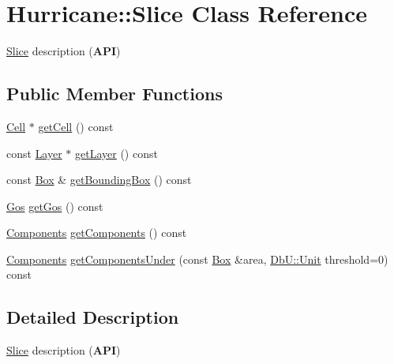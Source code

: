 \hypertarget{classHurricane_1_1Slice}{}\section{Hurricane\+:\+:Slice Class Reference}
\label{classHurricane_1_1Slice}


\mbox{\hyperlink{classHurricane_1_1Slice}{Slice}} description ({\bfseries A\+PI})  


\subsection*{Public Member Functions}
\begin{DoxyCompactItemize}
\item 
\mbox{\hyperlink{classHurricane_1_1Cell}{Cell}} $\ast$ \mbox{\hyperlink{classHurricane_1_1Slice_ae7a75f373a3d4e8878007c38688000f8}{get\+Cell}} () const
\item 
const \mbox{\hyperlink{classHurricane_1_1Layer}{Layer}} $\ast$ \mbox{\hyperlink{classHurricane_1_1Slice_a76c011cd461e588474a22fd0026e1f8f}{get\+Layer}} () const
\item 
const \mbox{\hyperlink{classHurricane_1_1Box}{Box}} \& \mbox{\hyperlink{classHurricane_1_1Slice_aa1a139b188879c37a8878a2353401d65}{get\+Bounding\+Box}} () const
\item 
\mbox{\hyperlink{namespaceHurricane_a4456a34f3bc6766d471c3064ace19759}{Gos}} \mbox{\hyperlink{classHurricane_1_1Slice_abc257f5b91c01c01a618787fd73db97b}{get\+Gos}} () const
\item 
\mbox{\hyperlink{namespaceHurricane_a7d26d99aeb5dd6d70d51bd35d2473e72}{Components}} \mbox{\hyperlink{classHurricane_1_1Slice_afe7c766d33e16461c3667af88e64773e}{get\+Components}} () const
\item 
\mbox{\hyperlink{namespaceHurricane_a7d26d99aeb5dd6d70d51bd35d2473e72}{Components}} \mbox{\hyperlink{classHurricane_1_1Slice_ada51a63690db8912eb58f1f33aa9f62c}{get\+Components\+Under}} (const \mbox{\hyperlink{classHurricane_1_1Box}{Box}} \&area, \mbox{\hyperlink{group__DbUGroup_ga4fbfa3e8c89347af76c9628ea06c4146}{Db\+U\+::\+Unit}} threshold=0) const
\end{DoxyCompactItemize}


\subsection{Detailed Description}
\mbox{\hyperlink{classHurricane_1_1Slice}{Slice}} description ({\bfseries A\+PI}) 

